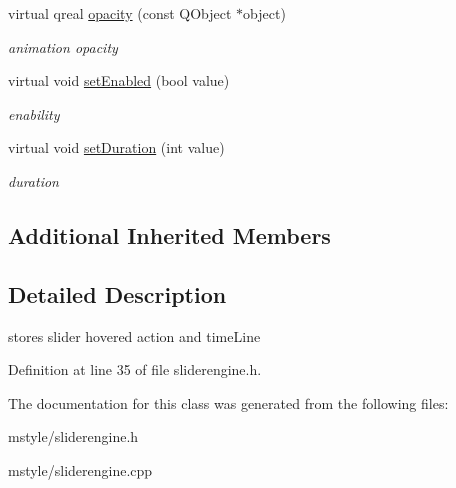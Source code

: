 \begin{DoxyCompactItemize}
\mbox{\label{class_slider_engine_a43a113d92f3309323f3cbef7d9d15973}} 
virtual qreal \hyperlink{class_slider_engine_a43a113d92f3309323f3cbef7d9d15973}{opacity} (const Q\+Object $\ast$object)
\begin{DoxyCompactList}\small\item\em animation opacity \end{DoxyCompactList}\item 
\mbox{\label{class_slider_engine_a8b6d7070a5dd9e6a836928bebd3c5b44}} 
virtual void \hyperlink{class_slider_engine_a8b6d7070a5dd9e6a836928bebd3c5b44}{set\+Enabled} (bool value)
\begin{DoxyCompactList}\small\item\em enability \end{DoxyCompactList}\item 
\mbox{\label{class_slider_engine_ad89821f0a46337dec6f1245d80be03fd}} 
virtual void \hyperlink{class_slider_engine_ad89821f0a46337dec6f1245d80be03fd}{set\+Duration} (int value)
\begin{DoxyCompactList}\small\item\em duration \end{DoxyCompactList}\end{DoxyCompactItemize}
\subsection*{Additional Inherited Members}


\subsection{Detailed Description}
stores slider hovered action and time\+Line 

Definition at line 35 of file sliderengine.\+h.



The documentation for this class was generated from the following files\+:\begin{DoxyCompactItemize}
\item 
mstyle/sliderengine.\+h\item 
mstyle/sliderengine.\+cpp\end{DoxyCompactItemize}
